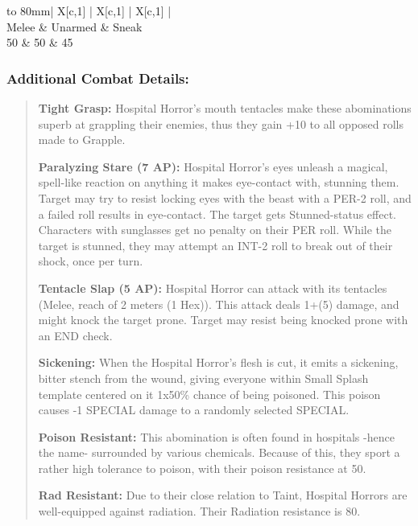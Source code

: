 \documentclass[11pt,a4paper,twocolumn]{book}
\begin{document}
	\bigskip
	{
		\begin{tabu} to 80mm{| X[c,1] | X[c,1] | X[c,1] |}
			\hline
			 \\ \hline
			Melee & Unarmed & Sneak                          \\
			50    & 50      & 45                             \\ \hline
		\end{tabu}
		
	}
	
	\subsubsection*{Additional Combat Details:}
	\begin{verse}
		\textbf{Tight Grasp:} Hospital Horror's mouth tentacles make these abominations superb at grappling their enemies, thus they gain +10 to all opposed rolls made to Grapple.
		
		\textbf{Paralyzing Stare (7 AP):} Hospital Horror's eyes unleash a magical, spell-like reaction on anything it makes eye-contact with, stunning them. Target may try to resist locking eyes with the beast with a PER-2 roll, and a failed roll results in eye-contact. The target gets Stunned-status effect. Characters with sunglasses get no penalty on their PER roll.
		While the target is stunned, they may attempt an INT-2 roll to break out of their shock, once per turn.
		
		\textbf{Tentacle Slap (5 AP):} Hospital Horror can attack with its tentacles (Melee, reach of 2 meters (1 Hex)). This attack deals 1+(5) damage, and might knock the target prone. Target may resist being knocked prone with an END check.
		
		\textbf{Sickening:} When the Hospital Horror's flesh is cut, it emits a sickening, bitter stench from the wound, giving everyone within Small Splash template centered on it 1x50\% chance of being poisoned. This poison causes -1 SPECIAL damage to a randomly selected SPECIAL.
		
		\textbf{Poison Resistant:} This abomination is often found in hospitals -hence the name- surrounded by various chemicals. Because of this, they sport a rather high tolerance to poison, with their poison resistance at 50.
		
		\textbf{Rad Resistant:} Due to their close relation to Taint, Hospital Horrors are well-equipped against radiation. Their Radiation resistance is 80.
	\end{verse}
	
\end{document}
